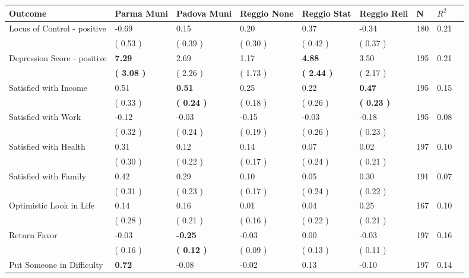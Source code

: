 \begin{tabular}{L{6.2cm} C{1.8cm} C{1.8cm} C{1.8cm} C{1.8cm} C{1.8cm} C{1.8cm} C{0.3cm} C{0.3cm}}
\toprule
 \textbf{Outcome} & \textbf{Parma Muni} & \textbf{Padova Muni} & \textbf{Reggio None} & \textbf{Reggio Stat} & \textbf{Reggio Reli} & \textbf{N} & \textbf{$ R^2$} \\
\midrule
Locus of Control - positive &     -0.69 &      0.15 &      0.20 &      0.37 &     -0.34  & 180 &       0.21 \\ 
 & (     0.53 ) & (     0.39 ) & (     0.30 ) & (     0.42 ) & (     0.37 )  & \\
Depression Score - positive & \textbf{     7.29} &      2.69 &      1.17 & \textbf{     4.88} &      3.50  & 195 &       0.21 \\ 
 & \textbf{(     3.08 )} & (     2.26 ) & (     1.73 ) & \textbf{(     2.44 )} & (     2.17 )  & \\
Satisfied with Income &      0.51 & \textbf{     0.51} &      0.25 &      0.22 & \textbf{     0.47}  & 195 &       0.15 \\ 
 & (     0.33 ) & \textbf{(     0.24 )} & (     0.18 ) & (     0.26 ) & \textbf{(     0.23 )}  & \\
Satisfied with Work &     -0.12 &     -0.03 &     -0.15 &     -0.03 &     -0.18  & 195 &       0.08 \\ 
 & (     0.32 ) & (     0.24 ) & (     0.19 ) & (     0.26 ) & (     0.23 )  & \\
Satisfied with Health &      0.31 &      0.12 &      0.14 &      0.07 &      0.02  & 197 &       0.10 \\ 
 & (     0.30 ) & (     0.22 ) & (     0.17 ) & (     0.24 ) & (     0.21 )  & \\
Satisfied with Family &      0.42 &      0.29 &      0.10 &      0.05 &      0.30  & 191 &       0.07 \\ 
 & (     0.31 ) & (     0.23 ) & (     0.17 ) & (     0.24 ) & (     0.22 )  & \\
Optimistic Look in Life &      0.14 &      0.16 &      0.01 &      0.04 &      0.25  & 167 &       0.10 \\ 
 & (     0.28 ) & (     0.21 ) & (     0.16 ) & (     0.22 ) & (     0.21 )  & \\
Return Favor &     -0.03 & \textbf{    -0.25} &     -0.03 &      0.00 &     -0.03  & 197 &       0.16 \\ 
 & (     0.16 ) & \textbf{(     0.12 )} & (     0.09 ) & (     0.13 ) & (     0.11 )  & \\
Put Someone in Difficulty & \textbf{     0.72} &     -0.08 &     -0.02 &      0.13 &     -0.10  & 197 &       0.14 \\ 

\end{tabular}
